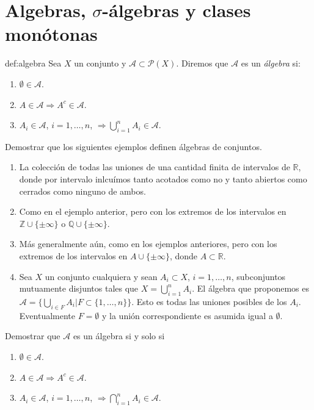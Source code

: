 \section{Algebras, $\sigma$-álgebras y clases monótonas}

\begin{definicion}{def:algebra} 
 Sea $X$ un conjunto y $\mathscr{A}\subset \mathcal{P}(X)$. Diremos que $\mathscr{A}$ es un \emph{álgebra} si:
 \begin{enumerate}
  \item $\emptyset\in\mathscr{A}$.
  \item $A\in\mathscr{A}\Rightarrow A^c\in\mathscr{A}$.
  \item $A_i\in\mathscr{A}$, $i=1,\ldots,n$, $\Rightarrow\bigcup_{i=1}^nA_i\in\mathscr{A}$.
 \end{enumerate}

\end{definicion}


\begin{ejercicio}{} Demostrar que los siguientes ejemplos definen álgebras de conjuntos.
 \begin{enumerate}
  \item La colección de todas las uniones de una cantidad finita de intervalos de $\mathbb{R}$, donde por intervalo inlcuímos tanto acotados como  no y tanto abiertos como cerrados como ninguno de ambos.
  \item Como en el ejemplo anterior, pero con los extremos de los intervalos en $\mathbb{Z}\cup \{\pm \infty\}$ o $\mathbb{Q}\cup \{\pm \infty\}$.
    \item Más generalmente aún, como en los ejemplos anteriores, pero con los extremos de los intervalos en $A\cup \{\pm \infty\}$, donde $A\subset\mathbb{R}$.
    \item Sea $X$ un conjunto cualquiera y sean $A_i\subset X$, $i=1,\ldots,n$, subconjuntos mutuamente disjuntos tales que $X=\bigcup_{i=1}^nA_i$. El álgebra que proponemos es $\mathscr{A}=\{\bigcup_{i\in F}A_i | F\subset\{1,\ldots,n\}\}$. Esto es todas las uniones posibles de los $A_i$. Eventualmente $F=\emptyset$ y la unión correspondiente es asumida igual a $\emptyset$. 
  
 \end{enumerate}
\end{ejercicio}
 \begin{ejercicio}{} Demostrar que $\mathscr{A}$  es un álgebra si y solo si
 \begin{enumerate}
  \item $\emptyset\in\mathscr{A}$.
  \item $A\in\mathscr{A}\Rightarrow A^c\in\mathscr{A}$.
  \item $A_i\in\mathscr{A}$, $i=1,\ldots,n$, $\Rightarrow\bigcap_{i=1}^nA_i\in\mathscr{A}$.
 \end{enumerate}
\end{ejercicio}

